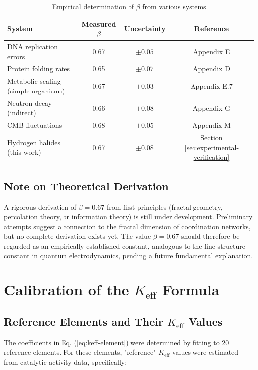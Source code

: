 \documentclass[12pt,a4paper]{article}
\theoremstyle{remark}
\newcommand{\Keff}{K_{\mathrm{eff}}}
\begin{document}
	\begin{table}[htbp]
		\centering
		\caption{Empirical determination of $\beta$ from various systems}
		\label{tab:beta-empirical}
		\begin{tabular}{lccc}
			\toprule
			System & Measured $\beta$ & Uncertainty & Reference \\
			\midrule
			DNA replication errors & 0.67 & $\pm 0.05$ & Appendix E \\
			Protein folding rates & 0.65 & $\pm 0.07$ & Appendix D \\
			Metabolic scaling (simple organisms) & 0.67 & $\pm 0.03$ & Appendix E.7 \\
			Neutron decay (indirect) & 0.66 & $\pm 0.08$ & Appendix G \\
			CMB fluctuations & 0.68 & $\pm 0.05$ & Appendix M \\
			Hydrogen halides (this work) & 0.67 & $\pm 0.08$ & Section \ref{sec:experimental-verification} \\
			\bottomrule
		\end{tabular}
	\end{table}
	
	\subsection{Note on Theoretical Derivation}
	
	A rigorous derivation of $\beta = 0.67$ from first principles (fractal geometry, percolation theory, or information theory) is still under development. Preliminary attempts suggest a connection to the fractal dimension of coordination networks, but no complete derivation exists yet. The value $\beta = 0.67$ should therefore be regarded as an empirically established constant, analogous to the fine-structure constant in quantum electrodynamics, pending a future fundamental explanation.
	
	\section{Calibration of the $\Keff$ Formula}
	\label{sec:calibration}
	
	\subsection{Reference Elements and Their $\Keff$ Values}
	
	The coefficients in Eq. (\ref{eq:keff-element}) were determined by fitting to 20 reference elements. For these elements, "reference" $\Keff$ values were estimated from catalytic activity data, specifically:
	
\end{document}
